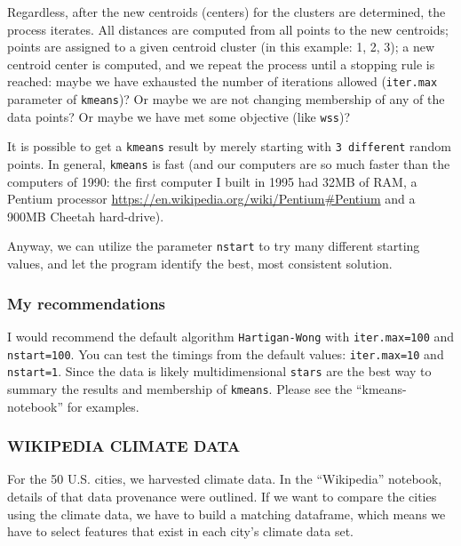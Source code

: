 \documentclass[
]{article}
\begin{document}
Regardless, after the new centroids (centers) for the clusters are
determined, the process iterates. All distances are computed from all
points to the new centroids; points are assigned to a given centroid
cluster (in this example: 1, 2, 3); a new centroid center is computed,
and we repeat the process until a stopping rule is reached: maybe we
have exhausted the number of iterations allowed (\texttt{iter.max}
parameter of \texttt{kmeans})? Or maybe we are not changing membership
of any of the data points? Or maybe we have met some objective (like
\texttt{wss})?

It is possible to get a \texttt{kmeans} result by merely starting with
\texttt{3\ different} random points. In general, \texttt{kmeans} is fast
(and our computers are so much faster than the computers of 1990: the
first computer I built in 1995 had 32MB of RAM, a Pentium processor
\url{https://en.wikipedia.org/wiki/Pentium\#Pentium} and a 900MB Cheetah
hard-drive).

Anyway, we can utilize the parameter \texttt{nstart} to try many
different starting values, and let the program identify the best, most
consistent solution.

\hypertarget{my-recommendations}{%
\subsubsection{My recommendations}\label{my-recommendations}}

I would recommend the default algorithm \texttt{Hartigan-Wong} with
\texttt{iter.max=100} and \texttt{nstart=100}. You can test the timings
from the default values: \texttt{iter.max=10} and \texttt{nstart=1}.
Since the data is likely multidimensional \texttt{stars} are the best
way to summary the results and membership of \texttt{kmeans}. Please see
the ``kmeans-notebook'' for examples.

\hypertarget{wikipedia-climate-data}{%
\subsubsection{WIKIPEDIA CLIMATE DATA}\label{wikipedia-climate-data}}

For the 50 U.S. cities, we harvested climate data. In the ``Wikipedia''
notebook, details of that data provenance were outlined. If we want to
compare the cities using the climate data, we have to build a matching
dataframe, which means we have to select features that exist in each
city's climate data set.
\end{document}
